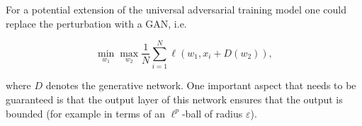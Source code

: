 For a potential extension of the universal adversarial training model one could replace the perturbation with a GAN, i.e.

$$ \min_{w_1} \max_{w_2} \frac1N \sum_{i = 1}^N \ell(w_1, x_i + D(w_2)) ,$$

where $D$ denotes the generative network. One important aspect that needs to be guaranteed is that the output layer of this network ensures that the output is bounded (for example in terms of an $\ell^p$-ball of radius $\varepsilon$). 